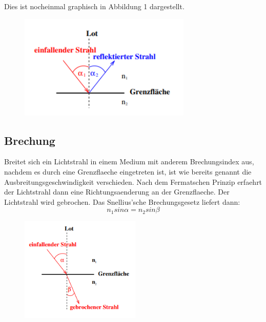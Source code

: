 \noindent Dies ist nocheinmal graphisch in Abbildung 1 dargestellt. 
\begin{figure}[H]
    \centering
    \captionsetup{justification=centering}
    \includegraphics[height=5cm]{"Reflexion_Beugung.png"}
    \label{Fig:Reflexion}
\end{figure}
\subsection{Brechung}
Breitet sich ein Lichtstrahl in einem Medium mit anderem Brechungsindex aus, nachdem es durch eine Grenzflaeche eingetreten ist, ist wie bereits genannt die Ausbreitungsgeschwindigkeit verschieden. Nach dem Fermatschen Prinzip erfaehrt der Lichtstrahl dann eine Richtungsaenderung an der Grenzflaeche. Der Lichtstrahl wird gebrochen. Das Snellius'sche Brechungsgesetz liefert dann:
\begin{equation}
    n_1sin\alpha=n_2sin\beta \label{Brechung}
\end{equation}
\begin{figure}[H]
    \centering
    \captionsetup{justification=centering}
    \includegraphics[height=5cm]{"Brechung_Beugung.png"}
    \label{Fig:Brechung}
\end{figure}
